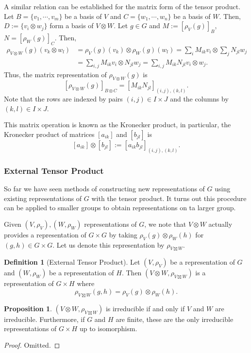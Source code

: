 \documentclass[]{article}
\theoremstyle{definition}
\theoremstyle{definition}
\newtheorem{definition}{Definition}[section]
\newtheorem{proposition}{Proposition}[section]
\begin{document}
A similar relation can be established for the matrix form of the tensor 
product. Let \(B = \{v_1, \cdots, v_m\}\) be a basis of \(V\) and 
\(C = \{w_1, \cdots, w_n\}\) be a basis of \(W\). Then, 
\(D := \{v_i \otimes w_j\}\) form a basis of \(V \otimes W\). Let \(g \in G\) 
and \(M := [\rho_V(g)]_B\), \(N = [\rho_W(g)]_C\). Then, 
\[\begin{split}
  \rho_{V \otimes W}(g)(v_k \otimes w_l) 
  & = \rho_V(g)(v_k) \otimes \rho_W(g)(w_l) 
    = \sum_i M_{ik}v_i \otimes \sum_j N_{jl}w_j\\
  & = \sum_{i, j} M_{ik}v_i \otimes N_{jl}w_j
    = \sum_{i, j} M_{ik}N_{jl} v_i \otimes w_j.
\end{split}\]
Thus, the matrix representation of \(\rho_{V \otimes W}(g)\) is 
\[[\rho_{V \otimes W}(g)]_{B \otimes C} = [M_{ik}N_{jl}]_{(i, j), (k, l)}.\]
Note that the rows are indexed by pairs \((i, j) \in I \times J\) and the 
columns by \((k, l) \in I \times J\). 

This matrix operation is known as the Kronecker product, in particular, the 
Kronecker product of matrices \([a_{ik}]\) and \([b_{jl}]\) is
\[[a_{ik}] \otimes [b_{jl}] := [a_{ik}b_{jl}]_{(i, j), (k, l)}.\]

\subsubsection{External Tensor Product}

So far we have seen methods of constructing new representations of \(G\) 
using existing representations of \(G\) with the tensor product. It turns 
out this procedure can be applied to smaller groups to obtain representations 
on ta larger group.

Given \((V, \rho_V), (W, \rho_W)\) representations of \(G\), we note that 
\(V \otimes W\) actually provides a representation of \(G \times G\) by 
taking \(\rho_V(g) \otimes \rho_W(h)\) for \((g, h) \in G \times G\). 
Let us denote this representation by \(\rho_{V \boxtimes W}\).

\begin{definition}[External Tensor Product]
  Let \((V, \rho_V)\) be a representation of \(G\) and \((W, \rho_W)\) be a 
  representation of \(H\). Then \((V \otimes W, \rho_{V \boxtimes W})\) is a 
  representation of \(G \times H\) where 
  \[\rho_{V \boxtimes W}(g, h) = \rho_V(g) \otimes \rho_W(h).\]
\end{definition}

\begin{proposition}
  \((V \otimes W, \rho_{V \boxtimes W})\) is irreducible if and only if 
  \(V\) and \(W\) are irreducible. Furthermore, if \(G\) and \(H\) are finite, 
  these are the only irreducible representations of \(G \times H\) up to 
  isomorphism.
\end{proposition}
\begin{proof}
  Omitted.
\end{proof}
\end{document}
